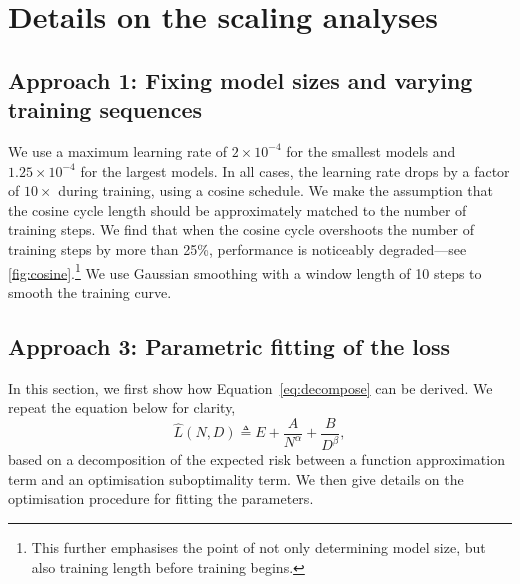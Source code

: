 \documentclass[11pt, a4paper, logo, copyright, nonumbering]{deepmind}
\begin{document}
\section{Details on the scaling analyses}
\label{sec:scaling_details}
\subsection{Approach 1: Fixing model sizes and varying training sequences}
We use a maximum learning rate of $2 \times 10^{-4}$ for the smallest models and $1.25 \times 10^{-4}$ for the largest models.
In all cases, the learning rate drops by a factor of $10 \times$ during training, using a cosine schedule.
We make the assumption that the cosine cycle length should be approximately matched to the number of training steps. 
We find that when the cosine cycle overshoots the number of training steps by more than 25\%, performance is noticeably degraded---see \autoref{fig:cosine}.\footnote{This further emphasises the point of not only determining model size, but also training length before training begins.}
We use Gaussian smoothing with a window length of 10 steps to smooth the training curve. 
\subsection{Approach 3: Parametric fitting of the loss}\label{app:parametric}
\label{sec:approach3}
In this section, we first show how Equation~\eqref{eq:decompose} can be derived. We repeat the equation below for clarity,
\begin{equation}
    \hat L(N,D) \triangleq E + \frac{A}{N^\alpha} + \frac{B}{D^\beta},
\end{equation}
based on a decomposition of the expected risk between a function approximation term and an optimisation suboptimality term.
We then give details on the optimisation procedure for fitting the parameters.
\end{document}
